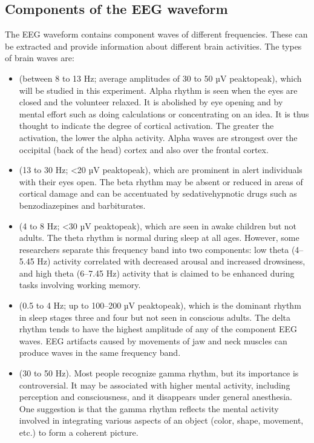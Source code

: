 \documentclass[letterpaper,10pt,english]{jupyterBook}
\begin{document}
\subsection{Components of the EEG waveform}
\label{\detokenize{EEG:components-of-the-eeg-waveform}}
\sphinxAtStartPar
The EEG waveform contains component waves of different frequencies. These can be extracted and provide information about different brain activities. The types of brain waves are:
\begin{itemize}
\item {} 
\sphinxAtStartPar
{} (between 8 to 13 Hz; average amplitudes of 30 to 50 µV peak\sphinxhyphen{}to\sphinxhyphen{}peak), which will be studied in this experiment. Alpha rhythm is seen when the eyes are closed and the volunteer relaxed. It is abolished by eye opening and by mental effort such as doing calculations or concentrating on an idea. It is thus thought to indicate the degree of cortical activation. The greater the activation, the lower the alpha activity. Alpha waves are strongest over the occipital (back of the head) cortex and also over the frontal cortex.

\item {} 
\sphinxAtStartPar
{} (13 to 30 Hz; <20 µV peak\sphinxhyphen{}to\sphinxhyphen{}peak), which are prominent in alert individuals with their eyes open. The beta rhythm may be absent or reduced in areas of cortical damage and can be accentuated by sedative\sphinxhyphen{}hypnotic drugs such as benzodiazepines and barbiturates.

\item {} 
\sphinxAtStartPar
{} (4 to 8 Hz; <30 µV peak\sphinxhyphen{}to\sphinxhyphen{}peak), which are seen in awake children but not adults. The theta rhythm is normal during sleep at all ages. However, some researchers separate this frequency band into two components: low theta (4–5.45 Hz) activity correlated with decreased arousal and increased drowsiness, and high theta (6–7.45 Hz) activity that is claimed to be enhanced during tasks involving working memory.

\item {} 
\sphinxAtStartPar
{} (0.5 to 4 Hz; up to 100–200 µV peak\sphinxhyphen{}to\sphinxhyphen{}peak), which is the dominant rhythm in sleep stages three and four but not seen in conscious adults. The delta rhythm tends to have the highest amplitude of any of the component EEG waves. EEG artifacts caused by movements of jaw and neck muscles can produce waves in the same frequency band.

\item {} 
\sphinxAtStartPar
{} (30 to 50 Hz). Most people recognize gamma rhythm, but its importance is controversial. It may be associated with higher mental activity, including perception and consciousness, and it disappears under general anesthesia. One suggestion is that the gamma rhythm reflects the mental activity involved in integrating various aspects of an object (color, shape, movement, etc.) to form a coherent picture.

\end{itemize}
\end{document}
